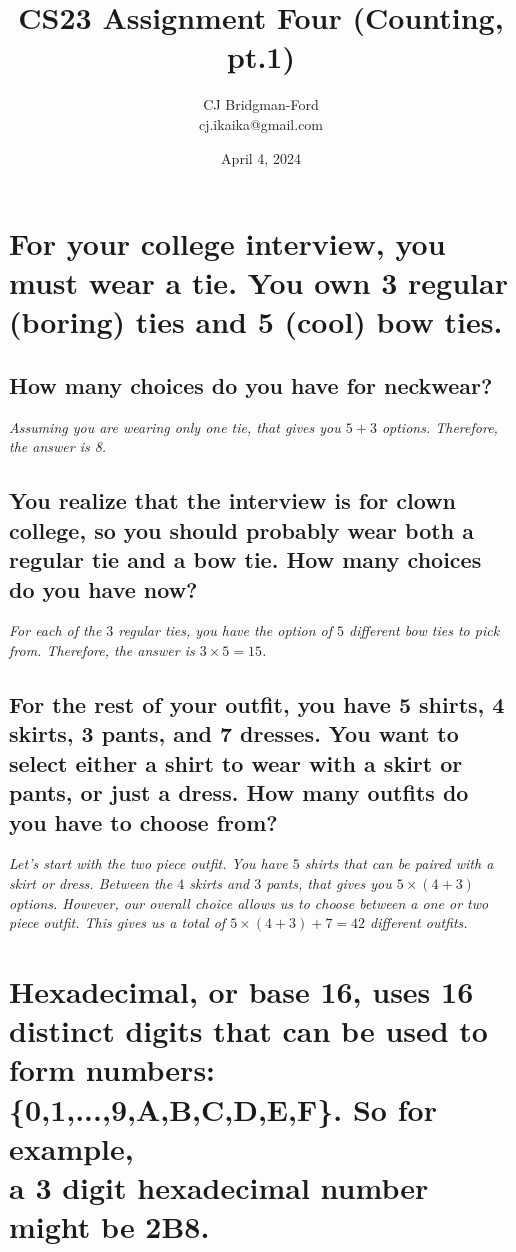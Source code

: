 \documentclass{article}
\title{CS23 Assignment Four (Counting, pt.1)}
\author{CJ Bridgman-Ford \\ cj.ikaika@gmail.com}
\date{April 4, 2024}
\begin{document}
\maketitle
\thispagestyle{empty}


\clearpage

\section{For your college interview, you must wear a tie.
    You own 3 regular (boring) ties and 5 (cool) bow ties.}
\subsection{How many choices do you have for neckwear?} 
\hspace{1cm}\textit{Assuming you are wearing only one tie, that gives you $5+3$ options.
    Therefore, the answer is 8.}
\subsection{You realize that the interview is for clown college,
    so you should probably wear both a regular tie and a bow tie. How many choices do you have now?}
 \hspace{1cm}\textit{For each of the $3$ regular ties, you have the option of $5$ different bow ties
    to pick from. Therefore, the answer is $3 \times 5 = 15$.}
\subsection{For the rest of your outfit, you have 5 shirts, 4 skirts, 3 pants, and 7 dresses.
    You want to select either a shirt to wear with a skirt or pants, or just a dress.
    How many outfits do you have to choose from?}
\hspace{1cm}\textit{Let's start with the two piece outfit. You have $5$ shirts that can be paired
    with a skirt or dress. Between the $4$ skirts and $3$ pants, that gives you $5\times(4+3)$ options.
    However, our overall choice allows us to choose between a one or two piece outfit. This gives us a
    total of $5\times(4+3)+7 = 42$ different outfits.}
\clearpage

\section{Hexadecimal, or base 16, uses 16 distinct digits that can be used to form numbers:
\\ \{0,1,...,9,A,B,C,D,E,F\}. So for example, \\ a 3 digit hexadecimal number might be 2B8.}
\end{document}
